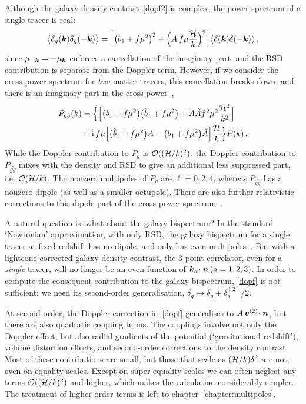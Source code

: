 Although the galaxy density contrast~\eqref{dopf2} is complex, the power spectrum of a single tracer is real:
\begin{equation}
\big\langle \delta_g(\bm {k})\delta_g(-\bm {k})\big\rangle
=\Big[ \big(b_{1} + f\mu^{2}\big)^2+\Big(A\,f \mu \frac{\mathcal{H}}{k}\Big)^2\Big] \big\langle \delta(\bm {k})\delta(-\bm {k})\big\rangle \,,\nonumber
\end{equation}
since $\mu_{-\bm {k}}=-\mu_{\bm {k}}$ enforces a cancellation of the imaginary part, and the RSD contribution is separate from the Doppler term.
However, if we consider the cross-power spectrum for {\em two} matter tracers, this cancellation breaks down, and  there is an imaginary part in the cross-power~\citep{McDonald:2009dh,Bonvin:2014owa},
\begin{align}
P_{g \tilde g}(k)&= \Big\{\Big[ \big(b_{1} + f\mu^{2}\big)\big(\tilde b_{1} + f\mu^{2}\big)+A\tilde A f^2\mu^2 {\frac{\mathcal{H}^2}{k^2}}\Big]\nonumber\\
&
+\mathrm{i\,} f\mu\Big[\big(\tilde b_{1} + f\mu^{2}\big)A-\big(b_{1} + f\mu^{2}\big)\tilde A\Big]{\frac{\mathcal{H}}{k}} \Big\}P(k) \,.\nonumber
\end{align}
While the Doppler contribution to $P_g$ is $\mathcal{O}((\mathcal{H}/k)^{2})$,  the Doppler contribution to $P_{g\tilde g}$ mixes with the density and RSD to give an additional less suppressed part, i.e. $\mathcal{O}(\mathcal{H}/k)$. The nonzero multipoles of $P_g$ are $\ell=0,2,4$, whereas  $P_{g \tilde g}$ has a nonzero dipole (as well as a smaller octupole).  There are also further relativistic corrections to this dipole part of the cross power spectrum~\citep{DiDio:2018zmk}.


A natural question is: what about the galaxy bispectrum? In the standard `Newtonian' approximation, with only RSD, the galaxy bispectrum for a single tracer at fixed redshift has no dipole, and only has even multipoles~\citep{Scoccimarro:1999ed,Nan:2017oaq}. But
with a lightcone corrected galaxy density contrast, the 3-point correlator, even for a {\em single} tracer, will no longer be an even function of $\bm {k}_a\!\cdot\bm {n} \,(a=1,2,3)$. In order to compute the consequent contribution to the galaxy bispectrum, \eqref{dopf} is not sufficient: we need its second-order generalisation, $\delta_g \to \delta_g+\delta^{(2)}_g/2$.


At second order, the Doppler correction in~\eqref{dopf} generalises to $A\, \bm{v}^{(2)}\!\cdot\bm {n}$, but there are also quadratic coupling terms. The couplings involve not only the Doppler effect, but also radial gradients of the potential (`gravitational redshift'), volume distortion effects, and second-order corrections to the density contrast. Most of these contributions are small, but those that scale as $(\mathcal{H}/k)\delta^2$ are not, even on equality scales. Except on super-equality scales we can often neglect any terms $\mathcal{O}((\mathcal{H}/k)^{2})$ and higher, which makes the calculation considerably simpler. The treatment of higher-order terms is left to chapter~\ref{chapter:multipoles}.

